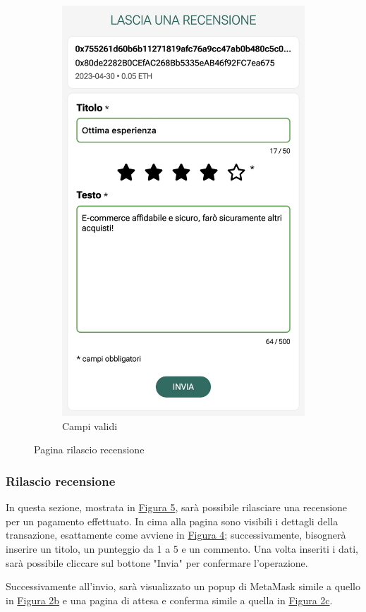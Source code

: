\begin{figure}[H]
\begin{subfigure}[t]{0.49\textwidth}
    \includegraphics[width=0.7\linewidth]{src/img/rilascio_recensione_valid.jpeg}
    \caption{Campi validi}\label{fig:rilascio_recensione_valid}
    \end{subfigure}

    \caption{Pagina rilascio recensione}\label{fig:rilascio_recensione}
\end{figure}

\subsubsection{Rilascio recensione}
In questa sezione, mostrata in \hyperref[fig:rilascio_recensione]{Figura 5}, sarà possibile rilasciare una recensione per un pagamento effettuato. In cima alla pagina sono visibili i dettagli della transazione, esattamente come avviene in \hyperref[fig:pagamenti]{Figura 4}; successivamente, bisognerà inserire un titolo, un punteggio da 1 a 5 e un commento. Una volta inseriti i dati, sarà possibile cliccare sul bottone "Invia" per confermare l'operazione.

Successivamente all'invio, sarà visualizzato un popup di MetaMask simile a quello in \hyperref[fig:checkout_metamask]{Figura 2b} e una pagina di attesa e conferma simile a quella in \hyperref[fig:checkout_conferma]{Figura 2c}.

